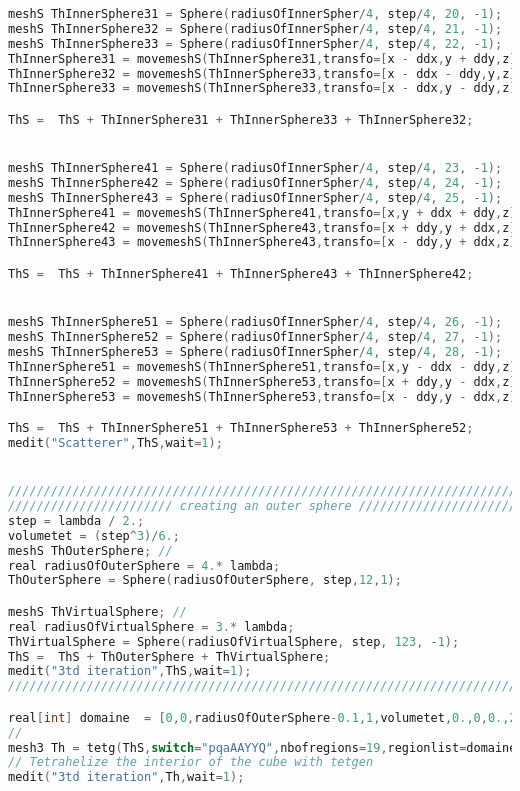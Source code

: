 \begin{lstlisting}[language=C]
meshS ThInnerSphere31 = Sphere(radiusOfInnerSpher/4, step/4, 20, -1);
meshS ThInnerSphere32 = Sphere(radiusOfInnerSpher/4, step/4, 21, -1);
meshS ThInnerSphere33 = Sphere(radiusOfInnerSpher/4, step/4, 22, -1);
ThInnerSphere31 = movemeshS(ThInnerSphere31,transfo=[x - ddx,y + ddy,z]);
ThInnerSphere32 = movemeshS(ThInnerSphere33,transfo=[x - ddx - ddy,y,z]);
ThInnerSphere33 = movemeshS(ThInnerSphere33,transfo=[x - ddx,y - ddy,z]);

ThS =  ThS + ThInnerSphere31 + ThInnerSphere33 + ThInnerSphere32;


meshS ThInnerSphere41 = Sphere(radiusOfInnerSpher/4, step/4, 23, -1);
meshS ThInnerSphere42 = Sphere(radiusOfInnerSpher/4, step/4, 24, -1);
meshS ThInnerSphere43 = Sphere(radiusOfInnerSpher/4, step/4, 25, -1);
ThInnerSphere41 = movemeshS(ThInnerSphere41,transfo=[x,y + ddx + ddy,z]);
ThInnerSphere42 = movemeshS(ThInnerSphere43,transfo=[x + ddy,y + ddx,z]);
ThInnerSphere43 = movemeshS(ThInnerSphere43,transfo=[x - ddy,y + ddx,z]);

ThS =  ThS + ThInnerSphere41 + ThInnerSphere43 + ThInnerSphere42;


meshS ThInnerSphere51 = Sphere(radiusOfInnerSpher/4, step/4, 26, -1);
meshS ThInnerSphere52 = Sphere(radiusOfInnerSpher/4, step/4, 27, -1);
meshS ThInnerSphere53 = Sphere(radiusOfInnerSpher/4, step/4, 28, -1);
ThInnerSphere51 = movemeshS(ThInnerSphere51,transfo=[x,y - ddx - ddy,z]);
ThInnerSphere52 = movemeshS(ThInnerSphere53,transfo=[x + ddy,y - ddx,z]);
ThInnerSphere53 = movemeshS(ThInnerSphere53,transfo=[x - ddy,y - ddx,z]);

ThS =  ThS + ThInnerSphere51 + ThInnerSphere53 + ThInnerSphere52;
medit("Scatterer",ThS,wait=1);


/////////////////////////////////////////////////////////////////////////////
/////////////////////// creating an outer sphere ///////////////////////////////
step = lambda / 2.;
volumetet = (step^3)/6.;  
meshS ThOuterSphere; // 
real radiusOfOuterSphere = 4.* lambda;
ThOuterSphere = Sphere(radiusOfOuterSphere, step,12,1);

meshS ThVirtualSphere; // 
real radiusOfVirtualSphere = 3.* lambda;
ThVirtualSphere = Sphere(radiusOfVirtualSphere, step, 123, -1);
ThS =  ThS + ThOuterSphere + ThVirtualSphere;
medit("3td iteration",ThS,wait=1);
/////////////////////////////////////////////////////////////////////////////

real[int] domaine  = [0,0,radiusOfOuterSphere-0.1,1,volumetet,0.,0,0.,2,volumetetIn,0.,0,radiusOfVirtualSphere-0.1,3,volumetet,ddx,0,0.,4,volumetetIn,-ddx,0,0,5,volumetetIn,0,ddx,0,6,volumetetIn,0,-ddx,0,7,volumetetIn, ddx,ddy,0,8,volumetetIn,ddx,-ddy,0.,9,volumetetIn,ddx+ddy,0,0.,10,volumetetIn,-ddx,ddy,0,11,volumetetIn,-ddx,-ddy,0,12,volumetetIn,-ddx-ddy,0,0,13,volumetetIn, 0,ddx+ddy,0,14,volumetetIn, -ddy,ddx,0,15,volumetetIn, ddy,ddx,0,16,volumetetIn, 0, -ddx-ddy,0,17,volumetetIn, ddy,-ddx,0,18,volumetetIn, -ddy, -ddx,0,19,volumetetIn];
//
mesh3 Th = tetg(ThS,switch="pqaAAYYQ",nbofregions=19,regionlist=domaine);
// Tetrahelize the interior of the cube with tetgen
medit("3td iteration",Th,wait=1);


\end{lstlisting}
